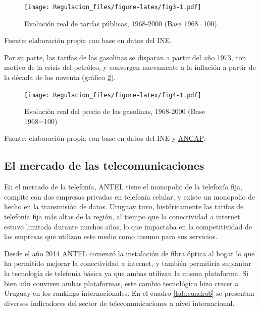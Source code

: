 \documentclass[
  12pt,
  spanish,
]{book}
\begin{document}
\begin{figure}
\centering
\texttt{[image: Regulacion\_files/figure-latex/fig3-1.pdf]}
\caption{\label{fig:fig3}Evolución real de tarifas públicas, 1968-2000 (Base 1968=100)}
\end{figure}

Fuente: elaboración propia con base en datos del INE.

Por su parte, las tarifas de las gasolinas se disparan a partir del año 1973, con motivo de la crisis del petróleo, y convergen nuevamente a la inflación a partir de la década de los noventa (gráfico \ref{fig:fig4}).\\

\begin{figure}
\centering
\texttt{[image: Regulacion\_files/figure-latex/fig4-1.pdf]}
\caption{\label{fig:fig4}Evolución real del precio de las gasolinas, 1968-2000 (Base 1968=100)}
\end{figure}

Fuente: elaboración propia con base en datos del INE y \href{https://www.ancap.com.uy/innovaportal/v/6088/1/innova.front/historico-precio-combustibles.html}{ANCAP}.

\hypertarget{el-mercado-de-las-telecomunicaciones}{%
\subsection{El mercado de las telecomunicaciones}\label{el-mercado-de-las-telecomunicaciones}}

En el mercado de la telefonía, ANTEL tiene el monopolio de la telefonía fija, compite con dos empresas privadas en telefonía celular, y existe un monopolio de hecho en la transmisión de datos. Uruguay tuvo, históricamente las tarifas de telefonía fija más altas de la región, al tiempo que la conectividad a internet estuvo limitada durante muchos años, lo que impactaba en la competitividad de las empresas que utilizan este medio como insumo para sus servicios.

Desde el año 2014 ANTEL comenzó la instalación de fibra óptica al hogar lo que ha permitido mejorar la conectividad a internet, y también permitiría suplantar la tecnología de telefonía básica ya que ambas utilizan la misma plataforma. Si bien aún conviven ambas plataformas, este cambio tecnológico hizo crecer a Uruguay en los rankings internacionales. En el cuadro \ref{tab:cuadro6} se presentan diversos indicadores del sector de telecomunicaciones a nivel internacional.
\end{document}
